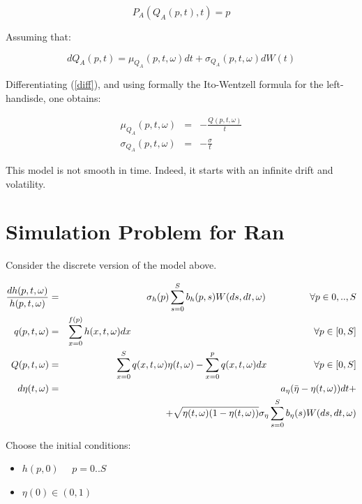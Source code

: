 \documentclass{article}
\begin{document}
\begin{equation}
P_{A}(Q_{A}(p,t),t)=p  \label{diff}
\end{equation}

Assuming that:

\begin{equation*}
dQ_{A}(p,t)=\mu _{Q_{A}}(p,t,\omega )dt+\sigma _{Q_{A}}(p,t,\omega )dW(t)
\end{equation*}

Differentiating (\ref{diff}), and using formally the Ito-Wentzell formula
for the left-handisde, one obtains:

\begin{eqnarray*}
\mu _{Q_{A}}(p,t,\omega ) &=&-\frac{Q(p,t,\omega )}{t} \\
\sigma _{Q_{A}}(p,t,\omega ) &=&-\frac{\sigma }{t}
\end{eqnarray*}

This model is not smooth in time. Indeed, it starts with an infinite drift
and volatility.

\section{Simulation Problem for Ran}

Consider the discrete version of the model above.

\begin{eqnarray}
\frac{dh(p,t,\omega )}{h(p,t,\omega )} &=&\sigma
_{h}(p)\sum_{s=0}^{S}b_{h}(p,s)W(ds,dt,\omega )\text{ \ \ \ \ \ \ \ \ \ \ \ }%
\forall p\in 0,..,S \\
q(p,t,\omega ) &=&\sum_{x=0}^{f(p)}h(x,t,\omega )dx\text{ \ \ \ \ \ \ \ \ \
\ \ \ \ \ \ \ \ \ \ \ \ \ \ \ \ \ \ \ \ \ \ \ \ \ \ \ \ \ \ \ \ \ \ \ \ \ \
\ \ \ \ \ \ \ \ }\forall p\in \lbrack 0,S] \\
Q(p,t,\omega ) &=&\sum_{x=0}^{S}q(x,t,\omega )\eta (t,\omega
)-\sum_{x=0}^{p}q(x,t,\omega )dx\text{ \ \ \ \ \ \ \ \ \ \ \ \ }\forall p\in
\lbrack 0,S] \\
d\eta (t,\omega ) &=&a_{\eta }(\bar{\eta}-\eta (t,\omega ))dt+ \\
&&+\sqrt{\eta (t,\omega )(1-\eta (t,\omega ))}\sigma _{\eta
}\sum_{s=0}^{S}b_{\eta }(s)W(ds,dt,\omega )
\end{eqnarray}

Choose the initial conditions:

\begin{itemize}
\item $h(p,0)$ \ \ $p=0..S$

\item $\eta (0)\in (0,1)$
\end{itemize}
\end{document}
